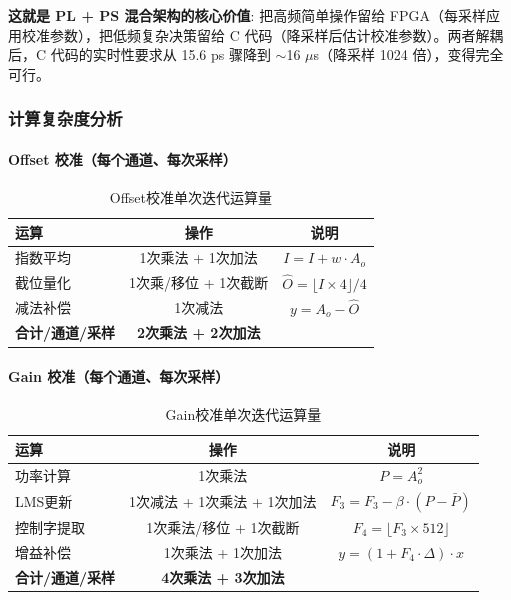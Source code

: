 \documentclass[UTF8,a4paper,11pt]{ctexart}
\begin{document}
\textbf{这就是 PL + PS 混合架构的核心价值}: 把高频简单操作留给 FPGA（每采样应用校准参数），把低频复杂决策留给 C 代码（降采样后估计校准参数）。两者解耦后，C 代码的实时性要求从 15.6 ps 骤降到 $\sim$16 $\mu$s（降采样 1024 倍），变得完全可行。

\subsubsection{计算复杂度分析}

\paragraph{Offset 校准（每个通道、每次采样）}

\begin{table}[ht]
\centering
\caption{Offset校准单次迭代运算量}
\begin{tabular}{lcc}
\toprule
\textbf{运算} & \textbf{操作} & \textbf{说明} \\
\midrule
指数平均 & 1次乘法 + 1次加法 & $I = I + w \cdot A_o$ \\
截位量化 & 1次乘/移位 + 1次截断 & $\hat{O} = \lfloor I \times 4 \rfloor / 4$ \\
减法补偿 & 1次减法 & $y = A_o - \hat{O}$ \\
\midrule
\textbf{合计/通道/采样} & \textbf{2次乘法 + 2次加法} & \\
\bottomrule
\end{tabular}
\end{table}

\paragraph{Gain 校准（每个通道、每次采样）}

\begin{table}[ht]
\centering
\caption{Gain校准单次迭代运算量}
\begin{tabular}{lcc}
\toprule
\textbf{运算} & \textbf{操作} & \textbf{说明} \\
\midrule
功率计算 & 1次乘法 & $P = A_o^2$ \\
LMS更新 & 1次减法 + 1次乘法 + 1次加法 & $F_3 = F_3 - \beta \cdot (P - \bar{P})$ \\
控制字提取 & 1次乘法/移位 + 1次截断 & $F_4 = \lfloor F_3 \times 512 \rfloor$ \\
增益补偿 & 1次乘法 + 1次加法 & $y = (1 + F_4 \cdot \Delta) \cdot x$ \\
\midrule
\textbf{合计/通道/采样} & \textbf{4次乘法 + 3次加法} & \\
\bottomrule
\end{tabular}
\end{table}
\end{document}
